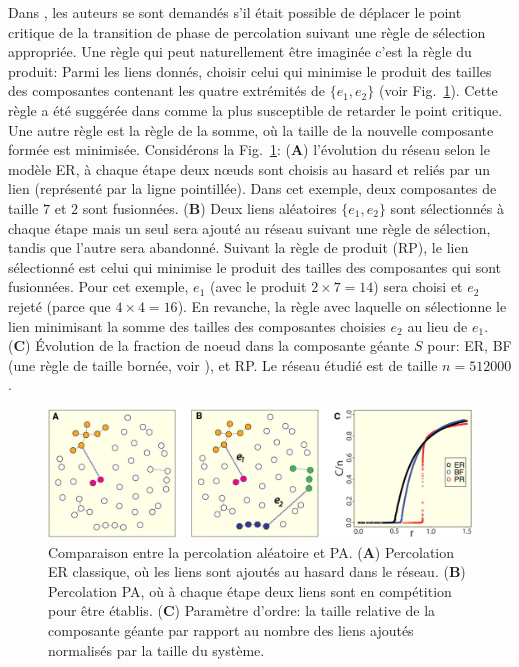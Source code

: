 Dans \cite{Achlioptas-al2009}, les auteurs se sont demandés s'il était possible de déplacer le point critique de la transition de phase de percolation suivant une règle de sélection appropriée. Une règle qui peut naturellement être imaginée c'est la règle du produit: Parmi les liens donnés, choisir celui qui minimise le produit des tailles des composantes contenant les quatre extrémités de $\{e_1,e_2\}$ (voir Fig.~\ref{achlioptas}). Cette règle a été suggérée dans \cite{Bollobas-1984} comme la plus susceptible de retarder le point critique. Une autre règle est la règle de la somme, où la taille de la nouvelle composante formée est minimisée.
Considérons la Fig.~\ref{achlioptas}: (\textbf{A}) l'évolution du réseau  selon le modèle ER, à chaque étape deux nœuds sont choisis au hasard et reliés par un lien (représenté par la ligne pointillée). Dans cet exemple, deux composantes de taille $7$ et $2$ sont fusionnées. (\textbf{B}) Deux liens aléatoires $\{e_1,e_2\}$ sont sélectionnés à chaque étape mais un seul sera ajouté au réseau suivant une règle de sélection, tandis que l'autre sera abandonné.
Suivant la règle de produit (RP), le lien sélectionné est celui qui minimise le produit des tailles des composantes qui sont fusionnées. Pour cet exemple, $e_1$ (avec le produit $2\times7=14$) sera choisi et $e_2$ rejeté (parce que $4\times4=16$). En revanche, la règle avec laquelle on sélectionne le lien minimisant la somme des tailles des composantes choisies $e_2$ au lieu de $e_1$. (\textbf{C}) Évolution de la  fraction de noeud dans la composante géante  $S$ pour: ER, BF (une règle de taille bornée, voir \cite{Bohman-Frieze2001}), et RP. Le réseau étudié est de taille $n=512000$.
\begin{figure}[h!]
	\centering
	\includegraphics[scale=0.35]{./figures/achlioptas3}
	\caption{Comparaison entre la percolation aléatoire et PA. (\textbf{A}) Percolation ER classique, où les liens sont ajoutés au hasard dans le réseau. (\textbf{B}) Percolation PA, où à chaque étape deux liens sont en compétition pour être établis. (\textbf{C}) Paramètre d'ordre: la taille relative de la composante géante par rapport au nombre des liens ajoutés normalisés par la taille du système.}
	\label{achlioptas}
\end{figure}

